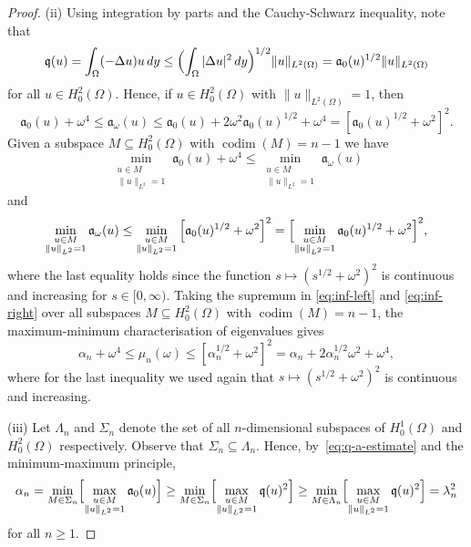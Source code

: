 \documentclass[a4paper, reqno,titlepage]{amsart}
\numberwithin{equation}{section}
\theoremstyle{plain}
\theoremstyle{definition}
\theoremstyle{remark}
\DeclareMathOperator{\codim}{codim}
\newcommand{\mfra}{\mathfrak{a}}
\newcommand{\mfrq}{\mathfrak{q}}
\begin{document}
\begin{proof}
  (ii) Using integration by parts and the Cauchy-Schwarz inequality, note that
  \begin{equation}
    \label{eq:q-a-estimate}
    \mfrq(u)
    =\int_\Omega (-\Delta u)u\,dy
    \leq \Bigl(\int_\Omega|\Delta u|^2\,dy\Bigr)^{1/2}\|u\|_{L^2(\Omega)}
    =\mfra_0(u)^{1/2}\|u\|_{L^2(\Omega)}
  \end{equation}
  for all $u\in H_0^2(\Omega)$. Hence, if $u\in H_0^2(\Omega)$ with $\|u\|_{L^2(\Omega)}=1$, then
  \begin{equation*}
    \mfra_0(u)+\omega^4
    \leq \mfra_\omega(u)
    \leq \mfra_0(u)+2\omega^2\mfra_0(u)^{1/2}+\omega^4
    =\left[\mfra_0(u)^{1/2}+\omega^2\right]^2.
  \end{equation*}
  Given a subspace $M\subseteq H_0^2(\Omega)$ with $\codim(M)=n-1$ we have
  \begin{equation}
    \label{eq:inf-left}
    \min_{\substack{u\in M\\\|u\|_{L^2}=1}}\mfra_0(u)+\omega^4
    \leq\min_{\substack{u\in M\\\|u\|_{L^2}=1}}\mfra_\omega(u)
  \end{equation}
  and
  \begin{equation}
    \label{eq:inf-right}
    \min_{\substack{u\in M\\\|u\|_{L^2}=1}}\mfra_\omega(u)
    \leq\min_{\substack{u\in M\\\|u\|_{L^2}=1}}
    \left[\mfra_0(u)^{1/2}+\omega^2\right]^2
    =\Bigl[\min_{\substack{u\in M\\\|u\|_{L^2}=1}}\mfra_0(u)^{1/2}+\omega^2\Bigr]^2,
  \end{equation}
  where the last equality holds since the function $s\mapsto (s^{1/2}+\omega^2)^2$ is continuous and increasing for $s\in[0,\infty)$. Taking the supremum in \eqref{eq:inf-left} and \eqref{eq:inf-right} over all subspaces $M\subseteq H_0^2(\Omega)$ with $\codim(M)=n-1$, the maximum-minimum characterisation of eigenvalues gives
  \begin{equation*}
    \alpha_n+\omega^4\leq \mu_n(\omega)
    \leq\left[\alpha_n^{1/2}+\omega^2\right]^2
    =\alpha_n+2\alpha_n^{1/2}\omega^2+\omega^4,
  \end{equation*}
  where for the last inequality we used again that $s\mapsto (s^{1/2}+\omega^2)^2$ is continuous and increasing.

  (iii)  Let $\Lambda_n$ and $\Sigma_n$ denote the set of all $n$-dimensional subspaces of $H^1_0(\Omega)$ and $H^2_0(\Omega)$ respectively. Observe that $\Sigma_n\subseteq\Lambda_n$. Hence, by~\eqref{eq:q-a-estimate} and the minimum-maximum principle,
  \begin{equation*}
    \alpha_n
    = \min_{M \in \Sigma_n} \Bigl[\max_{\substack{u\in M\\\|u\|_{L^2}=1}}\mfra_0(u)\Bigr]
    \geq \min_{M \in \Sigma_n} \Bigl[\max_{\substack{u\in M\\\|u\|_{L^2}=1}}\mfrq(u)^2\Bigr]
    \geq \min_{M \in \Lambda_n} \Bigl[\max_{\substack{u\in M\\\|u\|_{L^2}=1}}\mfrq(u)^2\Bigr]
    =\lambda_n^2
  \end{equation*}
  for all $n \ge 1$.
\end{proof}
\end{document}
